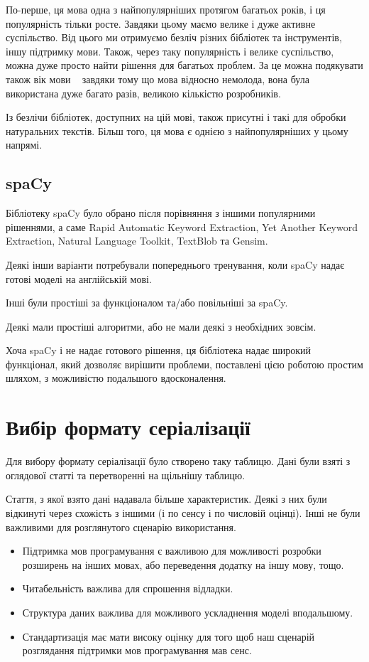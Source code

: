 \documentclass{article}
\let\oldsection\section
\renewcommand{\section}{\clearpage\oldsection}
\begin{document}
По-перше, ця мова одна з найпопулярніших протягом багатьох років,
і ця популярність тільки росте.
Завдяки цьому маємо велике і дуже активне суспільство.
Від цього ми отримуємо безліч різних бібліотек та інструментів, іншу підтримку мови.
Також, через таку популярність і велике суспільство,
можна дуже просто найти рішення для багатьох проблем.
За це можна подякувати також вік мови \textemdash~
завдяки тому що мова відносно немолода, вона була використана дуже багато разів,
великою кількістю розробників.

Із безлічи бібліотек, доступних на цій мові, також присутні
і такі для обробки натуральних текстів. Більш того, ця мова є однією з
найпопулярніших у цьому напрямі.

\subsection{spaCy}

Бібліотеку spaCy було обрано після порівняння з іншими популярними рішеннями,
а саме Rapid Automatic Keyword Extraction, Yet Another Keyword Extraction,
Natural Language Toolkit, TextBlob та Gensim.

Деякі інши варіанти потребували попереднього тренування, коли spaCy надає
готові моделі на англійській мові.

Інші були простіші за функціоналом та/або повільніші за spaCy.

Деякі мали простіші алгоритми, або не мали деякі з необхідних зовсім.

Хоча spaCy і не надає готового рішення,
ця бібліотека надає широкий функціонал, який дозволяє вирішити проблеми,
поставлені цією роботою простим шляхом, з можливістю подальшого вдосконалення.

\section{Вибір формату серіалізації}
Для вибору формату серіалізації було створено таку таблицю.
Дані були взяті з оглядової статті та перетворенні на щільнішу таблицю.

Стаття, з якої взято дані надавала більше характеристик.
Деякі з них були відкинуті через схожість з іншими (і по сенсу і по числовій оцінці).
Інші не були важливими для розглянутого сценарію використання.

\begin{itemize}
\item Підтримка мов програмування є важливою для можливості розробки розширень
  на інших мовах, або переведення додатку на іншу мову, тощо.
\item Читабельність важлива для спрошення відладки.
\item Структура даних важлива для можливого ускладнення моделі вподальшому.
\item Стандартизація має мати високу оцінку для того щоб наш сценарій
  розглядання підтримки мов програмування мав сенс.
\end{itemize}
\end{document}
